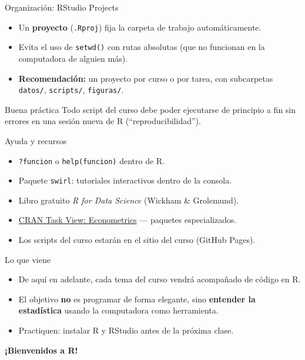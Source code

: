 \documentclass[aspectratio=169]{beamer}
\begin{document}
\begin{frame}{Organización: RStudio Projects}
\begin{itemize}
  \item<1-> Un \textbf{proyecto} (\texttt{.Rproj}) fija la carpeta de trabajo automáticamente.
  \item<2-> Evita el uso de \texttt{setwd()} con rutas absolutas (que no funcionan en la computadora de alguien más).
  \item<3-> \textbf{Recomendación:} un proyecto por curso o por tarea, con subcarpetas \texttt{datos/}, \texttt{scripts/}, \texttt{figuras/}.
\end{itemize}

\pause
\begin{alertblock}{Buena práctica}
Todo script del curso debe poder ejecutarse de principio a fin sin errores en una sesión nueva de R (``reproducibilidad'').
\end{alertblock}
\end{frame}

\begin{frame}{Ayuda y recursos}
\begin{itemize}
  \item \texttt{?funcion} o \texttt{help(funcion)} dentro de R.
  \item Paquete \texttt{swirl}: tutoriales interactivos dentro de la consola.
  \item Libro gratuito \textit{R for Data Science} (Wickham \& Grolemund).
  \item \href{https://cran.r-project.org/web/views/Econometrics.html}{CRAN Task View: Econometrics} — paquetes especializados.
  \item Los scripts del curso estarán en el sitio del curso (GitHub Pages).
\end{itemize}
\end{frame}

\begin{frame}{Lo que viene}
\begin{itemize}
  \item De aquí en adelante, cada tema del curso vendrá acompañado de código en R.
  \item El objetivo \textbf{no} es programar de forma elegante, sino \textbf{entender la estadística} usando la computadora como herramienta.
  \item Practiquen: instalar R y RStudio antes de la próxima clase.
\end{itemize}

\vspace{0.5cm}
\centering
\Large \textbf{¡Bienvenidos a R!}
\end{frame}
\end{document}
